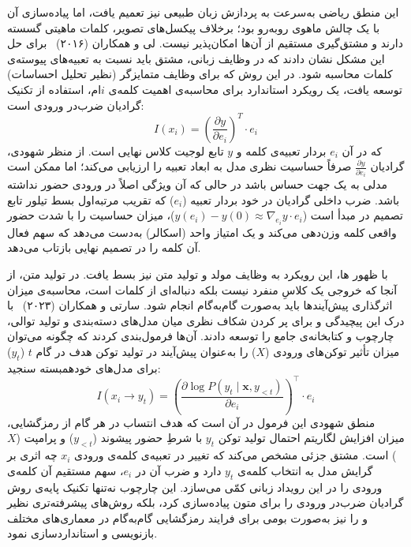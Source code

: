 این منطق ریاضی به‌سرعت به پردازش زبان طبیعی نیز تعمیم یافت، اما پیاده‌سازی آن با یک چالش ماهوی روبه‌رو بود؛ برخلاف پیکسل‌های تصویر، کلمات ماهیتی گسسته دارند و مشتق‌گیری مستقیم از آن‌ها امکان‌پذیر نیست. لی و همکاران (۲۰۱۶)~\cite{li2016visualizing} برای حل این مشکل نشان دادند که در وظایف زبانی، مشتق باید نسبت به تعبیه‌های پیوسته‌ی کلمات محاسبه شود. در این روش که برای وظایف متمایزگر (نظیر تحلیل احساسات) توسعه یافت، یک رویکرد استاندارد برای محاسبه‌ی اهمیت کلمه‌ی $i$ام، استفاده از تکنیک گرادیان ضرب‌در ورودی است:
\begin{equation}\label{eq:chap3_grad_x_input}
    I(x_i) = {\left( \frac{\partial y}{\partial e_i} \right)}^T \cdot e_i
\end{equation}
که در آن $e_i$ بردار تعبیه‌ی کلمه و $y$ تابع لوجیت کلاس نهایی است. از منظر شهودی، گرادیان $\frac{\partial y}{\partial e_i}$ صرفاً حساسیت نظری مدل به ابعاد تعبیه را ارزیابی می‌کند؛ اما ممکن است مدلی به یک جهت حساس باشد در حالی که آن ویژگی اصلاً در ورودی حضور نداشته باشد. ضرب داخلی گرادیان در خود بردار تعبیه ($e_i$) که تقریب مرتبه‌اول بسط تیلور تابع تصمیم در مبدأ است ($y(e_i) - y(0) \approx \nabla_{e_i} y \cdot e_i$)، میزان حساسیت را با شدت حضور واقعی کلمه وزن‌دهی می‌کند و یک امتیاز واحد (اسکالر) به‌دست می‌دهد که سهم فعال آن کلمه را در تصمیم نهایی بازتاب می‌دهد.

با ظهور ها، این رویکرد به وظایف مولد و تولید متن نیز بسط یافت. در تولید متن، از آنجا که خروجی یک کلاسِ منفرد نیست بلکه دنباله‌ای از کلمات است، محاسبه‌ی میزان اثرگذاری پیش‌آیندها باید به‌صورت گام‌به‌گام انجام شود. سارتی و همکاران (۲۰۲۳)~\cite{sarti2023inseq} با درک این پیچیدگی و برای پر کردن شکاف نظری میان مدل‌های دسته‌بندی و تولید توالی، چارچوب و کتابخانه‌ی جامع  را توسعه دادند. آن‌ها فرمول‌بندی کردند که چگونه می‌توان میزان تأثیر توکن‌های ورودی ($X$) را به‌عنوان پیش‌آیند در تولید توکن هدف در گام $t$ ($y_t$) برای مدل‌های خودهمبسته سنجید:
\begin{equation}\label{eq:chap3_inseq}
    I(x_i \rightarrow y_t) = {\left( \frac{\partial \log P(y_t \mid \mathbf{x}, y_{<t})}{\partial e_i} \right)}^\top \cdot e_i
\end{equation}
منطق شهودی این فرمول در آن است که هدف انتساب در هر گام از رمزگشایی، میزان افزایش لگاریتم احتمال تولید توکن $y_t$ با شرطِ حضور پیشوند ($y_{<t}$) و پرامپت ($X$) است. مشتق جزئی مشخص می‌کند که تغییر در تعبیه‌ی کلمه‌ی ورودی $x_i$ چه اثری بر گرایش مدل به انتخاب کلمه‌ی $y_t$ دارد و ضرب آن در $e_i$، سهم مستقیم آن کلمه‌ی ورودی را در این رویداد زبانی کمّی می‌سازد. این چارچوب نه‌تنها تکنیک پایه‌ی روش گرادیان ضرب‌در ورودی را برای متون پیاده‌سازی کرد، بلکه روش‌های پیشرفته‌تری نظیر  و  را نیز به‌صورت بومی برای فرایند رمزگشایی گام‌به‌گام در معماری‌های مختلف بازنویسی و استانداردسازی نمود.

